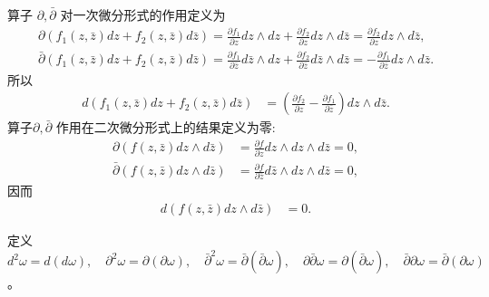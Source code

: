 \documentclass[../../main.tex]{subfiles}
\begin{document}
\begin{definition}
算子 \( \partial,\bar{\partial} \) 对一次微分形式的作用定义为
\begin{gather*}
\partial(f_1(z,\bar{z})dz + f_2(z,\bar{z})d\bar{z}) = \frac{\partial f_1}{\partial z}dz \wedge dz + \frac{\partial f_2}{\partial z}dz \wedge d\bar{z} = \frac{\partial f_2}{\partial z}dz \wedge d\bar{z},
\\
\bar{\partial}(f_1(z,\bar{z})dz + f_2(z,\bar{z})d\bar{z}) = \frac{\partial f_1}{\partial \bar{z}}d\bar{z} \wedge dz + \frac{\partial f_2}{\partial \bar{z}}d\bar{z} \wedge d\bar{z} = -\frac{\partial f_1}{\partial \bar{z}}dz \wedge d\bar{z}.
\end{gather*}
所以
\begin{align}
d(f_1(z,\bar{z})dz + f_2(z,\bar{z})d\bar{z}) &= \left( \frac{\partial f_2}{\partial z} - \frac{\partial f_1}{\partial \bar{z}} \right) dz \wedge d\bar{z}. \label{eq:2}
\end{align}
算子\( \partial,\bar{\partial} \) 作用在二次微分形式上的结果定义为零:
\begin{align*}
\partial(f(z,\bar{z})dz \wedge d\bar{z}) &= \frac{\partial f}{\partial z}dz \wedge dz \wedge d\bar{z} = 0, \\
\bar{\partial}(f(z,\bar{z})dz \wedge d\bar{z}) &= \frac{\partial f}{\partial \bar{z}}d\bar{z} \wedge dz \wedge d\bar{z} = 0,
\end{align*}
因而
\begin{align}
d(f(z,\bar{z})dz \wedge d\bar{z}) &= 0. \label{eq:3}
\end{align}
\end{definition}

\begin{definition}
定义 \( d^2\omega = d(d\omega),\quad \partial^2\omega = \partial(\partial\omega),\quad \bar{\partial}^2\omega = \bar{\partial}(\bar{\partial}\omega),\quad \partial\bar{\partial}\omega = \partial(\bar{\partial}\omega) ,\quad \bar{\partial}\partial\omega = \bar{\partial}(\partial\omega) \)。
\end{definition}
\end{document}
